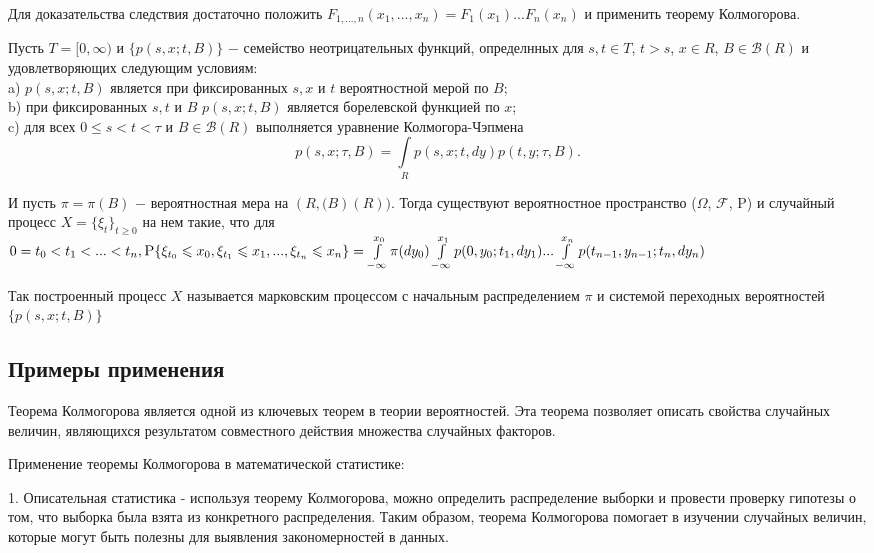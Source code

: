 Для доказательства следствия достаточно положить $F_{1, ... , n}(x_1, ... , x_n) = F_1(x_1) ... F_n(x_n)$  и применить теорему Колмогорова.

\begin{corollary} Пусть $T = [0, \infty)$ и $\{p(s, x; t, B)\}$ $-$ семейство неотрицательных функций, определнных для $s, t \in T$, $t > s$, $x \in R$, $B \in \mathscr{B}(R)$ и удовлетворяющих следующим условиям:\\
a) $p(s, x; t, B)$ является при фиксированных $s, x$ и $t$ вероятностной мерой по $B$;\\
b) при фиксированных $s, t$ и $B$ $p(s, x; t, B)$ является борелевской функцией по $x$;\\
c) для всех $0 \leq s < t < \tau$ и $B \in \mathscr{B}(R)$ выполняется уравнение Колмогора-Чэпмена
$$p(s, x; \tau, B) = \int\limits_R p(s, x; t, dy)p(t, y; \tau, B).$$

И пусть $\pi = \pi(B)$ $-$ вероятностная мера на $(R, \mathscr(B)(R)).$ Тогда существуют вероятностное пространство ($\Omega$, $\mathscr{F}$, P) и случайный процесс $X = \{\xi_t\}_{t\geq 0}$ на нем такие, что для $0 = t_0 < t_1 < ... < t_n, \\  \textsc{P}\{\xi_{t_0} \leq x_0, \xi_{t_1} \leq x_1, ... , \xi_{t_n} \leq x_n \} = \int\limits_{-\infty}^{x_0} \pi(dy_0) \int\limits_{-\infty}^{x_1} p(0, y_0; t_1, dy_1)...\int\limits_{-\infty}^{x_n} p(t_{n-1}, y_{n-1}; t_n, dy_n)$

Так построенный процесс $X$ называется марковским процессом с начальным распределением $\pi$ и системой переходных вероятностей$\{ p(s, x; t, B)\}$
\end{corollary}

\subsection{Примеры применения}

Теорема Колмогорова является одной из ключевых теорем в теории вероятностей. Эта теорема позволяет описать свойства случайных величин, являющихся результатом совместного действия множества случайных факторов.

Применение теоремы Колмогорова в математической статистике:

1. Описательная статистика - используя теорему Колмогорова, можно определить распределение выборки и провести проверку гипотезы о том, что выборка была взята из конкретного распределения. Таким образом, теорема Колмогорова помогает в изучении случайных величин, которые могут быть полезны для выявления закономерностей в данных.

